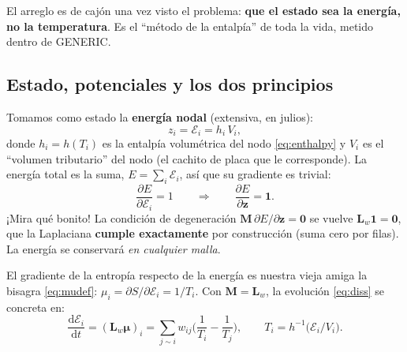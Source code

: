 \documentclass[11pt]{article}
\newcommand{\dd}{\mathrm{d}}
\newcommand{\Lw}{\bm{L}_{w}}
\newcommand{\bmu}{\bm{\mu}}
\theoremstyle{definition}
\theoremstyle{plain}
\begin{document}
El arreglo es de cajón una vez visto el problema: \textbf{que el estado sea la
energía, no la temperatura}. Es el ``método de la entalpía'' de toda la vida,
metido dentro de GENERIC.

\subsection{Estado, potenciales y los dos principios}

Tomamos como estado la \textbf{energía nodal} (extensiva, en julios):
\begin{equation}
  z_i = \mathcal E_i = h_i\,V_i,
  \label{eq:state}
\end{equation}
donde $h_i=h(T_i)$ es la entalpía volumétrica del nodo \eqref{eq:enthalpy} y $V_i$
es el ``volumen tributario'' del nodo (el cachito de placa que le corresponde). La
energía total es la suma, $E=\sum_i\mathcal E_i$, así que su gradiente es
trivial:
\begin{equation}
  \frac{\partial E}{\partial\mathcal E_i}=1
  \qquad\Longrightarrow\qquad
  \frac{\partial E}{\partial\bm z}=\bm 1 .
  \label{eq:gradE}
\end{equation}
¡Mira qué bonito! La condición de degeneración $\bm M\,\partial E/\partial\bm z=\bm0$
se vuelve $\Lw\bm 1=\bm 0$, que la Laplaciana \textbf{cumple exactamente} por
construcción (suma cero por filas). La energía se conservará \emph{en cualquier
malla}.

El gradiente de la entropía respecto de la energía es nuestra vieja amiga la
bisagra \eqref{eq:mudef}: $\mu_i=\partial S/\partial\mathcal E_i=1/T_i$. Con
$\bm M=\Lw$, la evolución \eqref{eq:diss} se concreta en:
\begin{equation}
  \boxed{\;
  \frac{\dd\mathcal E_i}{\dd t} = (\Lw\bmu)_i
  = \sum_{j\sim i} w_{ij}\Big(\frac{1}{T_i}-\frac{1}{T_j}\Big),
  \qquad
  T_i = h^{-1}\!\big(\mathcal E_i/V_i\big).
  \;}
  \label{eq:enthevol}
\end{equation}
\end{document}
